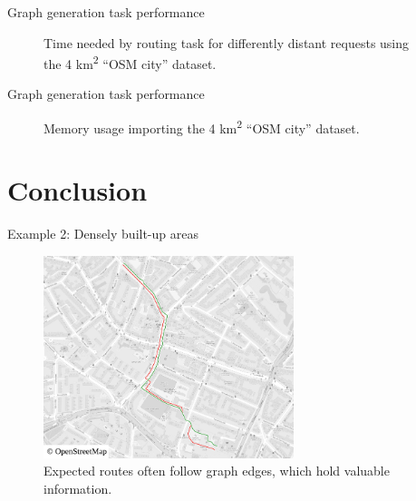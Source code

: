 \documentclass[xcolor={x11names}]{beamer}
\newenvironment{figcenter}
{%
	\parskip=0pt%
	\par%
	\nopagebreak%
	\centering%
}%
{%
	\par%
	\noindent%
	\ignorespacesafterend%
}
\newcommand{\startBackupSlides}
{
	\appendix
	\renewcommand*\insertshorttitle
	{
		\makebox[0.94\textwidth]{\oldmacro\hfill Appendix -- (\insertframenumber)\,/\,\inserttotalframenumber}
	}
}
\begin{document}
		\begin{frame}{Graph generation task performance}
			\begin{figure}
				\begin{figcenter}
					\hspace*{-0.35cm}
					\scalebox{0.7}
					{
						
					}
				\end{figcenter}
				\caption{Time needed by routing task for differently distant requests using the 4 km\textsuperscript{2} \enquote{OSM city} dataset.}
			\end{figure}
		\end{frame}
		
		\begin{frame}{Graph generation task performance}
			\begin{figure}
				\begin{figcenter}
					\hspace*{-0.35cm}
					\scalebox{0.7}
					{
						
					}
				\end{figcenter}
				\caption{Memory usage importing the 4 km\textsuperscript{2} \enquote{OSM city} dataset.}
			\end{figure}
		\end{frame}
	
	\section{Conclusion}
	
	\startBackupSlides
	
	\begin{frame}{Example 2: Densely built-up areas}
		\begin{figure}[t]
			\begin{figcenter}
				\includegraphics[width=0.65\textwidth]{images/qgis-routing-similar.pdf}
			\end{figcenter}
			\caption{Expected routes often follow graph edges, which hold valuable information.}
		\end{figure}
	\end{frame}
	
\end{document}
